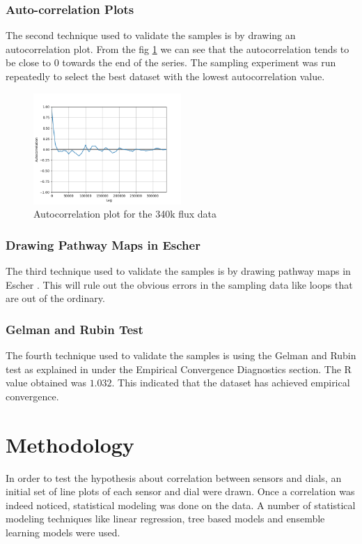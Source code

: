 \documentclass[12pt,chapterheads]{ucsd}
\begin{document}
\subsection{Auto-correlation Plots}
The second technique used to validate the samples is by drawing an autocorrelation plot. From the fig \ref{fig:acp} we can see that the autocorrelation tends to be close to 0 towards the end of the series. The sampling experiment was run repeatedly to select the best dataset with the lowest autocorrelation value.

\begin{figure}[h] 
\centering
\includegraphics[width=0.5\textwidth]{Figures/acp_330k}
\caption[Autocorrelation plot]
{Autocorrelation plot for the 340k flux data}
\label{fig:acp}
\end{figure}

\subsection{Drawing Pathway Maps in Escher}
The third technique used to validate the samples is by drawing pathway maps in Escher \cite{10.1371/journal.pcbi.1004321}. This will rule out the obvious errors in the sampling data like loops that are out of the ordinary. 

\subsection{Gelman and Rubin Test}
The fourth technique used to validate the samples is using the Gelman and Rubin test as explained in \cite{10.1371/journal.pone.0086587} under the Empirical Convergence Diagnostics section. The R value obtained was $1.032$. This indicated that the dataset has achieved empirical convergence. 


\chapter{Methodology}\label{chap:method}
In order to test the hypothesis about correlation between sensors and dials, an 
initial set of line plots of each sensor and dial were drawn. Once a correlation was indeed noticed, statistical modeling was done on the data. A number of statistical modeling techniques like linear regression, tree based models and ensemble learning models were used. 
\end{document}
